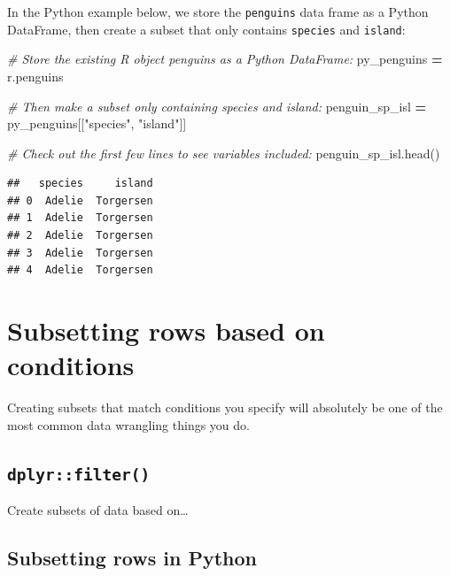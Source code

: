 \documentclass[
]{book}
\newenvironment{Shaded}{\begin{snugshade}}{\end{snugshade}}
\newcommand{\CommentTok}[1]{\textcolor[rgb]{0.56,0.35,0.01}{\textit{#1}}}
\newcommand{\NormalTok}[1]{#1}
\newcommand{\OperatorTok}[1]{\textcolor[rgb]{0.81,0.36,0.00}{\textbf{#1}}}
\newcommand{\StringTok}[1]{\textcolor[rgb]{0.31,0.60,0.02}{#1}}
\begin{document}
In the Python example below, we store the \texttt{penguins} data frame as a Python DataFrame, then create a subset that only contains \texttt{species} and \texttt{island}:

\begin{Shaded}
\begin{Highlighting}[]
\CommentTok{\# Store the existing R object \textasciigrave{}penguins\textasciigrave{} as a Python DataFrame:}
\NormalTok{py\_penguins }\OperatorTok{=}\NormalTok{ r.penguins}

\CommentTok{\# Then make a subset only containing \textasciigrave{}species\textasciigrave{} and \textasciigrave{}island\textasciigrave{}:}
\NormalTok{penguin\_sp\_isl }\OperatorTok{=}\NormalTok{ py\_penguins[[}\StringTok{"species"}\NormalTok{, }\StringTok{"island"}\NormalTok{]]}

\CommentTok{\# Check out the first few lines to see variables included:}
\NormalTok{penguin\_sp\_isl.head()}
\end{Highlighting}
\end{Shaded}

\begin{verbatim}
##   species     island
## 0  Adelie  Torgersen
## 1  Adelie  Torgersen
## 2  Adelie  Torgersen
## 3  Adelie  Torgersen
## 4  Adelie  Torgersen
\end{verbatim}

\hypertarget{subsetting-rows-based-on-conditions}{%
\section{Subsetting rows based on conditions}\label{subsetting-rows-based-on-conditions}}

Creating subsets that match conditions you specify will absolutely be one of the most common data wrangling things you do.

\hypertarget{dplyrfilter}{%
\subsection{\texorpdfstring{\texttt{dplyr::filter()}}{dplyr::filter()}}\label{dplyrfilter}}

Create subsets of data based on\ldots{}

\hypertarget{subsetting-rows-in-python}{%
\subsection{Subsetting rows in Python}\label{subsetting-rows-in-python}}
\end{document}
